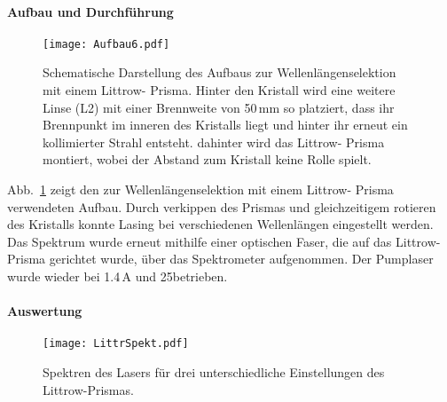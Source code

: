 \paragraph{Aufbau und Durchführung}

\begin{figure}[H]
\begin{center}
  \texttt{[image: Aufbau6.pdf]}
  \caption{Schematische Darstellung des Aufbaus zur Wellenlängenselektion mit einem Littrow- Prisma. Hinter den Kristall wird eine weitere Linse (L2) mit einer Brennweite von 50\,mm so platziert, dass ihr Brennpunkt im inneren des Kristalls liegt und hinter ihr erneut ein kollimierter Strahl entsteht. dahinter wird das Littrow- Prisma montiert, wobei der Abstand zum Kristall keine Rolle spielt.}
  \label{img:aufbau6}
\end{center}
\end{figure}

Abb.~\ref{img:aufbau6} zeigt den zur Wellenlängenselektion mit einem Littrow- Prisma verwendeten Aufbau. Durch verkippen des Prismas und gleichzeitigem rotieren des Kristalls konnte Lasing bei verschiedenen Wellenlängen eingestellt werden. Das Spektrum wurde erneut mithilfe einer optischen Faser, die auf das Littrow- Prisma gerichtet wurde, über das Spektrometer aufgenommen. Der Pumplaser wurde wieder bei 1.4\,A und 25\grad betrieben.



\paragraph{Auswertung}



\begin{figure}[H]
\begin{center}
  \texttt{[image: LittrSpekt.pdf]}
  \caption{Spektren des Lasers für drei unterschiedliche Einstellungen des Littrow-Prismas.}
  \label{img:LittrSpekt}
\end{center}
\end{figure}
